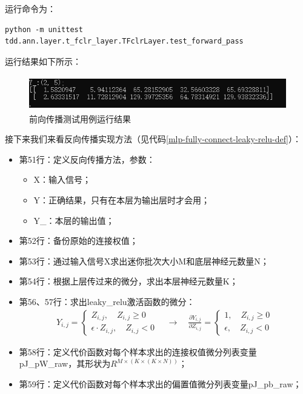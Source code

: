 \documentclass[UTF8]{article}
\begin{document}
运行命令为：
\begin{lstlisting}
python -m unittest tdd.ann.layer.t_fclr_layer.TFclrLayer.test_forward_pass
\end{lstlisting}
运行结果如下所示：
\begin{figure}[H]
	\caption{前向传播测试用例运行结果}
	\label{f000070}
	\centering
	\includegraphics[height=1.5cm]{images/f000070}
\end{figure}
接下来我们来看反向传播实现方法（见代码\ref{mlp-fully-connect-leaky-relu-def}）：
\begin{itemize}
\item 第51行：定义反向传播方法，参数：
	\begin{itemize}
	\item X：输入信号；
	\item Y：正确结果，只有在本层为输出层时才会用；
	\item Y\_：本层的输出值；
	\end{itemize}
\item 第52行：备份原始的连接权值；
\item 第53行：通过输入信号X求出迷你批次大小M和底层神经元数量N；
\item 第54行：根据上层传过来的微分，求出本层神经元数量K；
\item 第56、57行：求出leaky\_relu激活函数的微分：
\begin{equation}
\begin{aligned}
Y_{i,j}=\begin{cases}
 Z_{i,j}, \quad Z_{i,j} \ge 0 \\
 \epsilon \cdot Z_{i,j}, \quad Z_{i,j} < 0
 \end{cases} \quad \rightarrow \quad
 \frac{\partial{Y_{i,j}}}{\partial{Z_{i,j}}}=\begin{cases}
1, \quad Z_{i,j} \ge 0 \\
\epsilon, \quad Z_{i,j} < 0
\end{cases}
\end{aligned}
\label{mlp-leaky-relu-gradient-unittest}
\end{equation}
\item 第58行：定义代价函数对每个样本求出的连接权值微分列表变量pJ\_pW\_raw，其形状为$R^{M \times (K \times (K \times N))}$；
\item 第59行：定义代价函数对每个样本求出的偏置值微分列表变量pJ\_pb\_raw；

\end{itemize}
\end{document}
